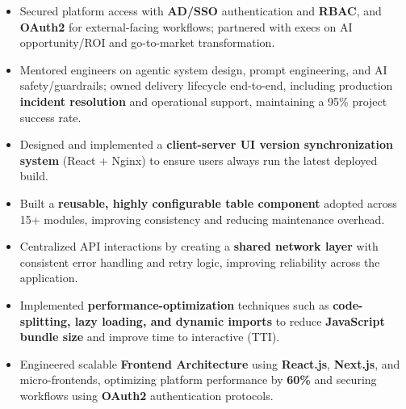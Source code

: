 \documentclass[a4paper]{article}
\begin{document}
\begin{itemize}
\item {Secured platform access with \textbf{AD/SSO} authentication and \textbf{RBAC}, and \textbf{OAuth2} for external-facing workflows; partnered with execs on AI opportunity/ROI and go-to-market transformation.}
\item {Mentored engineers on agentic system design, prompt engineering, and AI safety/guardrails; owned delivery lifecycle end-to-end, including production \textbf{incident resolution} and operational support, maintaining a 95\% project success rate.}
\item {Designed and implemented a \textbf{client-server UI version synchronization system} (React + Nginx) to ensure users always run the latest deployed build.}
\item {Built a \textbf{reusable, highly configurable table component} adopted across 15+ modules, improving consistency and reducing maintenance overhead.}
\item {Centralized API interactions by creating a \textbf{shared network layer} with consistent error handling and retry logic, improving reliability across the application.}
\item {Implemented \textbf{performance-optimization} techniques such as \textbf{code-splitting, lazy loading, and dynamic imports} to reduce \textbf{JavaScript bundle size} and improve time to interactive (TTI).}
\item {Engineered scalable \textbf{Frontend Architecture} using \textbf{React.js}, \textbf{Next.js}, and micro-frontends, optimizing platform performance by \textbf{60\%} and securing workflows using \textbf{OAuth2} authentication protocols.}
\end{itemize}
\end{document}
